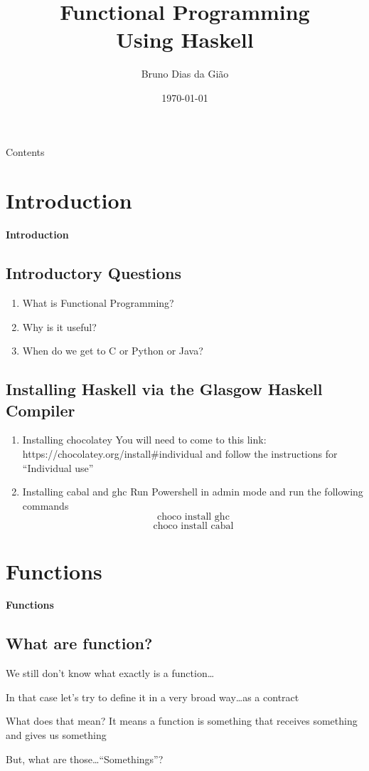 \documentclass[compress,svgnames,handout,13.7pt]{beamer}
\title[Functional Programming]
    {\textbf{Functional Programming}\\
    Using Haskell
}
\author[Bruno G.]
   {Bruno Dias da Gião
}
\date{\today}
\def\GHC{Glasgow Haskell Compiler\xspace}
\begin{document}
\thispagestyle{empty}
\frame{\titlepage}


\begin{frame}{Contents}
\tableofcontents
\end{frame}


\section{Introduction}
\begin{frame}
    \Huge{\textbf{Introduction}}
\end{frame}
\subsection{Introductory Questions}
\begin{frame}
    \begin{enumerate}
        \item{What is Functional Programming?}
    \pause\item{Why is it useful?}
    \pause\item{When do we get to C or Python or Java?}
    \end{enumerate}
\end{frame}
\subsection{Installing Haskell via the \GHC}
\begin{frame}
    \begin{enumerate}
        \item{Installing chocolatey} You will need to come to this link:
            https://chocolatey.org/install\#individual and follow the
            instructions for ``Individual use''
        \item{Installing cabal and ghc} Run Powershell in admin mode and
            run the following commands \[\text{choco install ghc}\]
            \[\text{choco install cabal}\]
    \end{enumerate}
\end{frame}

\section{Functions}
\begin{frame}
    \Huge{\textbf{Functions}}
\end{frame}
\subsection{What are function?}
\begin{frame}
    \huge{We still don't know what exactly is a function\ldots}
    \par
    \large{In that case let's try to define it in a very broad way\ldots as a contract
        \par What does that mean? It means a function is something that receives something
    and gives us something}\par
    But, what are those\ldots ``Somethings''?
\end{frame}
\end{document}
